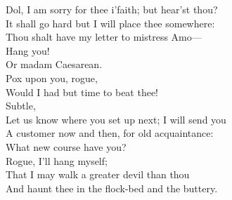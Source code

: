 \documentclass[a4paper,oneside,12pt]{memoir}
\begin{document}
\begin{drama*}
\facespeaks Dol, I am sorry for thee i'faith; but hear'st thou?\\
It shall go hard but I will place thee somewhere:\\
Thou shalt have my letter to mistress Amo---\\
\dolspeaks Hang you!\\
\facespeaks {} Or madam Caesarean.\\
\dolspeaks {} Pox upon you, rogue,\\
Would I had but time to beat thee!\\
\facespeaks {} Subtle,\\
Let us know where you set up next; I will send you\\
A customer now and then, for old acquaintance:\\
What new course have you?\\
\subtlespeaks {} Rogue, I'll hang myself;\\
That I may walk a greater devil than thou\\
And haunt thee in the flock-bed and the buttery.\\

\scene


\end{drama*}
\end{document}
